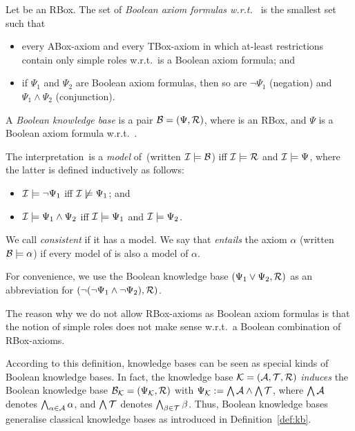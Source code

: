 \begin{definition}\label{def:boolean-kb}
    Let \Rmc be an RBox.  The set of \emph{Boolean axiom formulas w.r.t.~\Rmc}
    is the smallest set such that
    \begin{itemize}
        \item every ABox-axiom and every TBox-axiom in which at-least
            restrictions contain only simple roles w.r.t.~\Rmc is a Boolean
            axiom formula; and
        \item if $\Psi_1$ and $\Psi_2$ are Boolean axiom formulas, then so are
            $\lnot\Psi_1$ (negation) and $\Psi_1\land\Psi_2$ (conjunction).
    \end{itemize}
    A \emph{Boolean knowledge base} is a pair $\mathcal{B}=(\Psi,\mathcal{R})$,
    where \Rmc is an RBox, and $\Psi$ is a Boolean axiom formula w.r.t.~\Rmc.

    The interpretation~\Imc is a \emph{model} of~\Bmc (written
    $\mathcal{I}\models\mathcal{B}$) iff $\mathcal{I}\models\mathcal{R}$ and $\mathcal{I}\models\Psi$, where the
    latter is defined inductively as follows:
    \begin{itemize}
        \item $\mathcal{I}\models\lnot\Psi_1$ iff $\mathcal{I}\not\models\Psi_1$; and
        \item $\mathcal{I}\models\Psi_1\land\Psi_2$ iff $\mathcal{I}\models\Psi_1$ and
            $\mathcal{I}\models\Psi_2$.
    \end{itemize}
    We call \Bmc \emph{consistent} if it has a model.  We say that \Bmc
    \emph{entails} the axiom $\alpha$ (written $\mathcal{B}\models\alpha$) if every
    model of \Bmc is also a model of $\alpha$.
\end{definition}

\noindent
For convenience, we use the Boolean knowledge base
$(\Psi_1\lor\Psi_2,\mathcal{R})$ as an abbreviation for
$(\lnot(\lnot\Psi_1\land\lnot\Psi_2),\mathcal{R})$.

The reason why we do not allow RBox-axioms as Boolean axiom formulas is that the
notion of simple roles does not make sense w.r.t.\ a Boolean combination of
RBox-axioms.

According to this definition, knowledge bases can be seen as special kinds of
Boolean knowledge bases.  In fact, the knowledge base
$\mathcal{K}=(\mathcal{A},\mathcal{T},\mathcal{R})$ \emph{induces} the Boolean knowledge base
$\mathcal{B}_\mathcal{K}=(\Psi_\mathcal{K},\mathcal{R})$ with
$\Psi_\mathcal{K}:=\bigwedge\mathcal{A}\land\bigwedge\mathcal{T}$, where $\bigwedge\mathcal{A}$ denotes
$\bigwedge_{\alpha\in\mathcal{A}}\alpha$, and $\bigwedge\mathcal{T}$ denotes
$\bigwedge_{\beta\in\mathcal{T}}\beta$.  Thus, Boolean knowledge bases generalise
classical knowledge bases as introduced in Definition~\ref{def:kb}.

